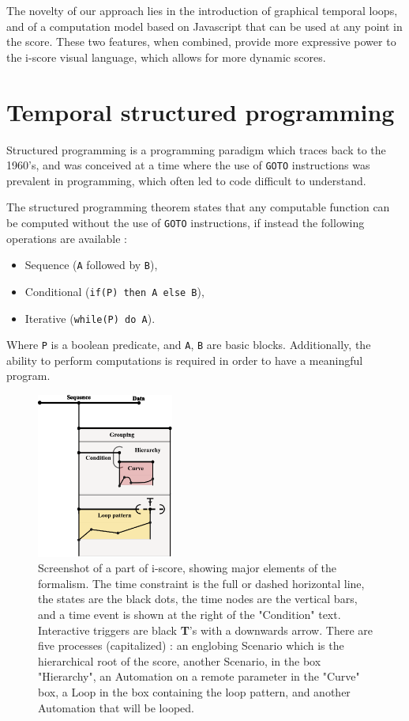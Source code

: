 \documentclass{article}
\begin{document}
The novelty of our approach lies in the introduction of graphical temporal loops, and of a computation model 
based on Javascript that can be used at any point in the score. 
These two features, when combined, provide more expressive power to the i-score visual language, 
which allows for more dynamic scores.

\section{Temporal structured programming}
Structured programming is a programming paradigm which traces 
back to the 1960's, and was conceived at a time where the use of \lstinline{GOTO}
instructions was prevalent in programming, which often led to code difficult to understand.

The structured programming theorem\cite{bohm1966flow,mills1972mathematical} states that any computable function can be computed 
without the use of \lstinline{GOTO} instructions, if instead the following operations are available : 
\begin{itemize}
    \item Sequence (\lstinline{A} followed by \lstinline{B}), 
    \item Conditional (\lstinline{if(P) then A else B}), 
    \item Iterative (\lstinline{while(P) do A}).
\end{itemize}

Where \lstinline|P| is a boolean predicate, and \lstinline|A|, \lstinline|B| are basic blocks.
Additionally, the ability to perform computations is required in order to have a meaningful program.

\begin{figure}
    \centering
    \includegraphics[width=0.40\textwidth]{images/hierarchy.eps}
    \caption{Screenshot of a part of i-score, showing major elements of the formalism. The time constraint is the full or dashed horizontal line, the states are the black dots, the time nodes are the vertical bars, and a time event is shown at the right of the "Condition" text. Interactive triggers are black \textbf{T}'s with a downwards arrow. There are five processes (capitalized) : an englobing Scenario which is the hierarchical root of the score, another Scenario, in the box "Hierarchy", an Automation on a remote parameter in the "Curve" box, a Loop in the box containing the loop pattern, and another Automation that will be looped.}
    \label{fig.hierarchy}
\end{figure}
\end{document}
